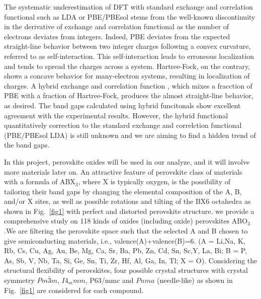 \documentclass[%
reprint,
superscriptaddress,
citeautoscript,
 amsmath,amssymb,
 aps,
 prl,
floatfix,
]{revtex4-1}
\begin{document}
The systematic underestimation of DFT with standard exchange and correlation functional such as LDA or PBE/PBEsol stems from the well-known discontinuity in the derivative of exchange and correlation functional as the number of electrons deviates from integers. Indeed, PBE deviates from the expected straight-line behavior between two integer charges following a convex curvature, referred to as self-interaction. This self-interaction leads to erroneous localization and tends to spread the charges across a system. Hartree-Fock, on the contrary, shows a concave behavior for many-electron systems, resulting in localization of charges. A hybrid exchange and correlation function , which mixes a fracction of PBE with a fraction of Hartree-Fock, produces the almost straight-line behavior, as desired. The band gaps calculated using hybrid funcitonals show excellent agreement with the experimental results. However, the hybrid functional quantitatively correction to the standard exchange and correlction functional (PBE/PBEsol LDA) is still unknown and we are aiming to find a hidden trend of the band gaps.

In this project, perovskite oxides will be used in our analyze, and it will involve more materials later on. An attractive feature of perovskite class of materials with a formula of ABX$_{3}$, where X is  typically  oxygen, is  the  possibility  of  tailoring  their  band  gaps  by changing the elemental composition of the A, B, and/or X sites, as well as possible rotations and tilting of the BX6 octahedra as shown in Fig.~\ref{fig1} with perfect and distorted perovskite structure.  we provide a comprehensive study on 118 kinds of oxides (including oxide) perovskites ABO$_{3}$.We are filtering the perovskite space such that the selected A and B chosen to give semiconducting materials, i.e., valence(A)+valence(B)=6. (A = Li,Na, K, Rb, Cs, Cu, Ag, Au, Be, Mg, Ca, Sr, Ba, Pb, Zn, Cd, Sn, Sc,Y, La, Bi; B = P, As, Sb, V,  Nb, Ta, Si, Ge, Sn, Ti, Zr, Hf, Al, Ga, In, Tl; X = O). Considering the structural flexibility of perovskites, four possible crystal structures with crystal symmetry $Pm\bar{3}m$, $I4_mmm$, P63/mmc and $Pnma$ (needle-like) as shown in Fig.~\ref{fig1} are considered for each compound.
\end{document}
